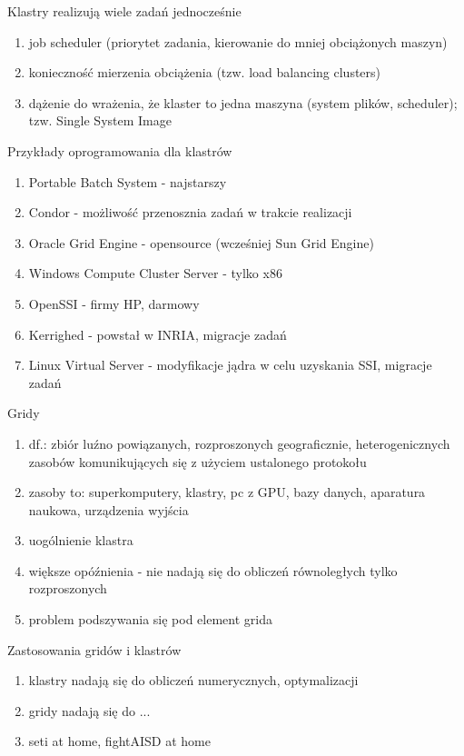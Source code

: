 \documentclass{beamer}
\begin{document}
\begin{frame}{Klastry realizują wiele zadań jednocześnie}
  \begin{enumerate}
  \item job scheduler (priorytet zadania, kierowanie do mniej obciążonych maszyn)
  \item konieczność mierzenia obciążenia (tzw. load balancing clusters)
  \item dążenie do wrażenia, że klaster to jedna maszyna (system plików, scheduler); tzw. Single System Image
  \end{enumerate}
\end{frame}

\begin{frame}{Przykłady oprogramowania dla klastrów}
  \begin{enumerate}
  \item Portable Batch System - najstarszy
  \item Condor - możliwość przenosznia zadań w trakcie realizacji
  \item Oracle Grid Engine - opensource (wcześniej Sun Grid Engine)
  \item Windows Compute Cluster Server - tylko x86
  \item OpenSSI - firmy HP, darmowy
  \item Kerrighed - powstał w INRIA, migracje zadań
  \item Linux Virtual Server - modyfikacje jądra w celu uzyskania SSI, migracje zadań
  \end{enumerate}
\end{frame}

\begin{frame}{Gridy}
  \begin{enumerate}
  \item df.: zbiór luźno powiązanych, rozproszonych geograficznie, heterogenicznych zasobów komunikujących się z użyciem ustalonego protokołu
  \item zasoby to: superkomputery, klastry, pc z GPU, bazy danych, aparatura naukowa, urządzenia wyjścia
  \item uogólnienie klastra
  \item większe opóźnienia - nie nadają się do obliczeń równoległych tylko rozproszonych
  \item problem podszywania się pod element grida
  \end{enumerate}
\end{frame}

\begin{frame}{Zastosowania gridów i klastrów}
  \begin{enumerate}
  \item klastry nadają się do obliczeń numerycznych, optymalizacji
  \item gridy nadają się do ...
  \item seti at home, fightAISD at home
  \end{enumerate}
\end{frame}
\end{document}
